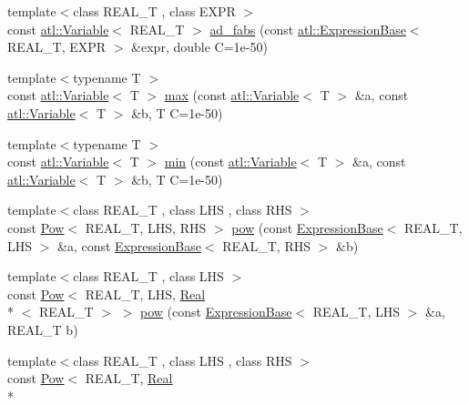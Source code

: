 \begin{DoxyCompactItemize}
\item 
{\footnotesize template$<$class R\+E\+A\+L\+\_\+\+T , class E\+X\+P\+R $>$ }\\const \hyperlink{structatl_1_1_variable}{atl\+::\+Variable}$<$ R\+E\+A\+L\+\_\+\+T $>$ \hyperlink{namespaceatl_a3b7620eadb39267aa49f9ab580bd03e9}{ad\+\_\+fabs} (const \hyperlink{structatl_1_1_expression_base}{atl\+::\+Expression\+Base}$<$ R\+E\+A\+L\+\_\+\+T, E\+X\+P\+R $>$ \&expr, double C=1e-\/50)
\item 
{\footnotesize template$<$typename T $>$ }\\const \hyperlink{structatl_1_1_variable}{atl\+::\+Variable}$<$ T $>$ \hyperlink{namespaceatl_a2c216278ccf731a964a7381ad0828cf4}{max} (const \hyperlink{structatl_1_1_variable}{atl\+::\+Variable}$<$ T $>$ \&a, const \hyperlink{structatl_1_1_variable}{atl\+::\+Variable}$<$ T $>$ \&b, T C=1e-\/50)
\item 
{\footnotesize template$<$typename T $>$ }\\const \hyperlink{structatl_1_1_variable}{atl\+::\+Variable}$<$ T $>$ \hyperlink{namespaceatl_ab8d55db393522162b719652d94d92870}{min} (const \hyperlink{structatl_1_1_variable}{atl\+::\+Variable}$<$ T $>$ \&a, const \hyperlink{structatl_1_1_variable}{atl\+::\+Variable}$<$ T $>$ \&b, T C=1e-\/50)
\item 
{\footnotesize template$<$class R\+E\+A\+L\+\_\+\+T , class L\+H\+S , class R\+H\+S $>$ }\\const \hyperlink{structatl_1_1_pow}{Pow}$<$ R\+E\+A\+L\+\_\+\+T, L\+H\+S, R\+H\+S $>$ \hyperlink{namespaceatl_affbabdc0cc02ced60061018a97b84249}{pow} (const \hyperlink{structatl_1_1_expression_base}{Expression\+Base}$<$ R\+E\+A\+L\+\_\+\+T, L\+H\+S $>$ \&a, const \hyperlink{structatl_1_1_expression_base}{Expression\+Base}$<$ R\+E\+A\+L\+\_\+\+T, R\+H\+S $>$ \&b)
\item 
{\footnotesize template$<$class R\+E\+A\+L\+\_\+\+T , class L\+H\+S $>$ }\\const \hyperlink{structatl_1_1_pow}{Pow}$<$ R\+E\+A\+L\+\_\+\+T, L\+H\+S, \hyperlink{structatl_1_1_real}{Real}\\*
$<$ R\+E\+A\+L\+\_\+\+T $>$ $>$ \hyperlink{namespaceatl_a43a9b70712d1c9a7703d7a6bc3611936}{pow} (const \hyperlink{structatl_1_1_expression_base}{Expression\+Base}$<$ R\+E\+A\+L\+\_\+\+T, L\+H\+S $>$ \&a, R\+E\+A\+L\+\_\+\+T b)
\item 
{\footnotesize template$<$class R\+E\+A\+L\+\_\+\+T , class L\+H\+S , class R\+H\+S $>$ }\\const \hyperlink{structatl_1_1_pow}{Pow}$<$ R\+E\+A\+L\+\_\+\+T, \hyperlink{structatl_1_1_real}{Real}\\*

\end{DoxyCompactItemize}
